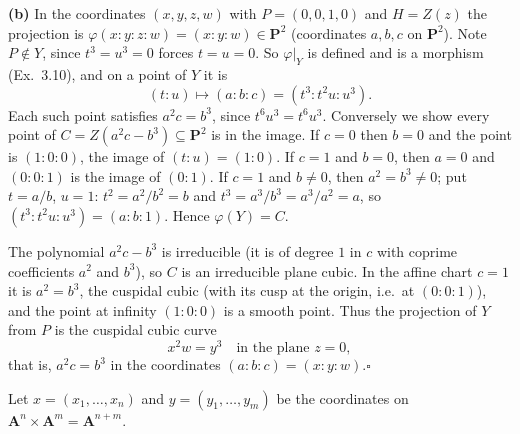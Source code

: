 \documentclass[11pt]{article}
\begin{document}
\textbf{(b)} In the coordinates $(x,y,z,w)$ with $P=(0,0,1,0)$ and $H=Z(z)$ the projection is $\varphi(x:y:z:w)=(x:y:w)\in\mathbf P^2$ (coordinates $a,b,c$ on $\mathbf P^2$). Note $P\notin Y$, since $t^3=u^3=0$ forces $t=u=0$. So $\varphi|_Y$ is defined and is a morphism (Ex.~3.10), and on a point of $Y$ it is
\[
(t:u)\longmapsto (a:b:c)=(t^3:t^2u:u^3).
\]
Each such point satisfies $a^2c=b^3$, since $t^6u^3=t^6u^3$. Conversely we show every point of $C=Z(a^2c-b^3)\subseteq\mathbf P^2$ is in the image. If $c=0$ then $b=0$ and the point is $(1:0:0)$, the image of $(t:u)=(1:0)$. If $c=1$ and $b=0$, then $a=0$ and $(0:0:1)$ is the image of $(0:1)$. If $c=1$ and $b\ne0$, then $a^2=b^3\neq 0$; put $t=a/b$, $u=1$: $t^2=a^2/b^2=b$ and $t^3=a^3/b^3=a^3/a^2=a$, so $(t^3:t^2u:u^3)=(a:b:1)$. Hence $\varphi(Y)=C$.

The polynomial $a^2c-b^3$ is irreducible (it is of degree $1$ in $c$ with coprime coefficients $a^2$ and $b^3$), so $C$ is an irreducible plane cubic. In the affine chart $c=1$ it is $a^2=b^3$, the cuspidal cubic (with its cusp at the origin, i.e.\ at $(0:0:1)$), and the point at infinity $(1:0:0)$ is a smooth point. Thus the projection of $Y$ from $P$ is the cuspidal cubic curve
\[
x^2w=y^3\quad\text{in the plane } z=0,
\]
that is, $a^2c=b^3$ in the coordinates $(a:b:c)=(x:y:w)$.\hfill$\square$

\pf
Let $x=(x_1,\dots,x_n)$ and $y=(y_1,\dots,y_m)$ be the coordinates on $\mathbf A^n\times\mathbf A^m=\mathbf A^{n+m}$.
\end{document}
